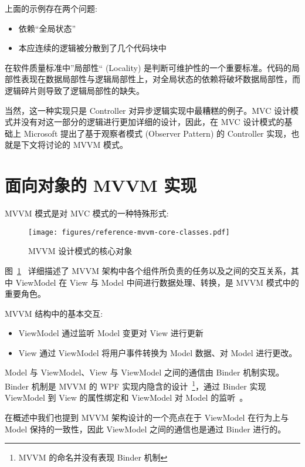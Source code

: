 上面的示例存在两个问题:

\begin{itemize}
  \item 依赖“全局状态”
  \item 本应连续的逻辑被分散到了几个代码块中
\end{itemize}

在软件质量标准中”局部性“ (Locality) 是判断可维护性的一个重要标准。代码的局部性表现在数据局部性与逻辑局部性上，对全局状态的依赖将破坏数据局部性，而逻辑碎片则导致了逻辑局部性的缺失。

当然，这一种实现只是 Controller 对异步逻辑实现中最糟糕的例子。MVC 设计模式并没有对这一部分的逻辑进行更加详细的设计，因此，在 MVC 设计模式的基础上 Microsoft 提出了基于观察者模式 (Observer Pattern) 的 Controller 实现，也就是下文将讨论的 MVVM 模式。

\section{面向对象的 MVVM 实现}

MVVM 模式是对 MVC 模式的一种特殊形式:

\begin{figure}[!h]
  \begin{center}
    \texttt{[image: figures/reference-mvvm-core-classes.pdf]}
    \caption{MVVM 设计模式的核心对象\label{MVVMCoreClasses}}
  \end{center}
\end{figure}

图~\ref{MVVMCoreClasses}~\cite{ghoda2012windows} 详细描述了 MVVM 架构中各个组件所负责的任务以及之间的交互关系，其中 ViewModel 在 View 与 Model 中间进行数据处理、转换，是 MVVM 模式中的重要角色。

MVVM 结构中的基本交互:

\begin{itemize}
  \item ViewModel 通过监听 Model 变更对 View 进行更新
  \item View 通过 ViewModel 将用户事件转换为 Model 数据、对 Model 进行更改。
\end{itemize}

Model 与 ViewModel、View 与 ViewModel 之间的通信由 Binder 机制实现。Binder 机制是 MVVM 的 WPF 实现内隐含的设计~\footnote{MVVM 的命名并没有表现 Binder 机制}，通过 Binder 实现 ViewModel 到 View 的属性绑定和 ViewModel 对 Model 的监听~\cite{Likness2010}。

在概述中我们也提到 MVVM 架构设计的一个亮点在于 ViewModel 在行为上与 Model 保持的一致性，因此 ViewModel 之间的通信也是通过 Binder 进行的。

